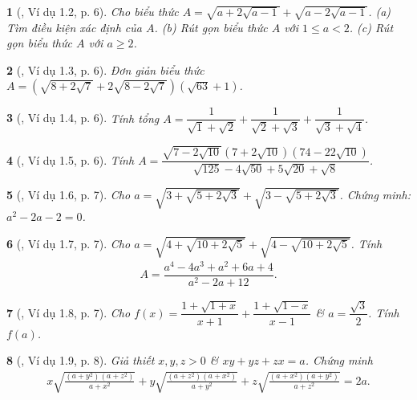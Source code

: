 \documentclass{article}
\newtheorem{baitoan}{}%
\begin{document}
\begin{baitoan}[\cite{TLCT_THCS_Toan_9_dai_so}, Ví dụ 1.2, p. 6]
	Cho biểu thức $A = \sqrt{a + 2\sqrt{a - 1}} + \sqrt{a - 2\sqrt{a - 1}}$. (a) Tìm điều kiện xác định của $A$. (b) Rút gọn biểu thức $A$ với $1\le a < 2$. (c) Rút gọn biểu thức $A$ với $a\ge2$.
\end{baitoan}

\begin{baitoan}[\cite{TLCT_THCS_Toan_9_dai_so}, Ví dụ 1.3, p. 6]
	Đơn giản biểu thức $A = \left(\sqrt{8 + 2\sqrt{7}} + 2\sqrt{8 - 2\sqrt{7}}\right)(\sqrt{63} + 1)$.
\end{baitoan}

\begin{baitoan}[\cite{TLCT_THCS_Toan_9_dai_so}, Ví dụ 1.4, p. 6]
	Tính tổng $A = \dfrac{1}{\sqrt{1} + \sqrt{2}} + \dfrac{1}{\sqrt{2} + \sqrt{3}} + \dfrac{1}{\sqrt{3} + \sqrt{4}}$.
\end{baitoan}

\begin{baitoan}[\cite{TLCT_THCS_Toan_9_dai_so}, Ví dụ 1.5, p. 6]
	Tính $A = \dfrac{\sqrt{7 - 2\sqrt{10}}(7 + 2\sqrt{10})(74 - 22\sqrt{10})}{\sqrt{125} - 4\sqrt{50} + 5\sqrt{20} + \sqrt{8}}$.
\end{baitoan}

\begin{baitoan}[\cite{TLCT_THCS_Toan_9_dai_so}, Ví dụ 1.6, p. 7]
	Cho $a = \sqrt{3 + \sqrt{5 + 2\sqrt{3}}} + \sqrt{3 - \sqrt{5 + 2\sqrt{3}}}$. Chứng minh: $a^2 - 2a - 2 = 0$.
\end{baitoan}

\begin{baitoan}[\cite{TLCT_THCS_Toan_9_dai_so}, Ví dụ 1.7, p. 7]
	Cho $a = \sqrt{4 + \sqrt{10 + 2\sqrt{5}}} + \sqrt{4 - \sqrt{10 + 2\sqrt{5}}}$. Tính
	\begin{align*}
		A = \dfrac{a^4 - 4a^3 + a^2 + 6a + 4}{a^2 - 2a + 12}.
	\end{align*}
\end{baitoan}

\begin{baitoan}[\cite{TLCT_THCS_Toan_9_dai_so}, Ví dụ 1.8, p. 7]
	Cho $f(x) = \dfrac{1 + \sqrt{1 + x}}{x + 1} + \dfrac{1 + \sqrt{1 - x}}{x - 1}$ \& $a = \dfrac{\sqrt{3}}{2}$. Tính $f(a)$.
\end{baitoan}

\begin{baitoan}[\cite{TLCT_THCS_Toan_9_dai_so}, Ví dụ 1.9, p. 8]
	Giả thiết $x,y,z > 0$ \& $xy + yz + zx = a$. Chứng minh
	\begin{align*}
		x\sqrt{\frac{(a + y^2)(a + z^2)}{a + x^2}} + y\sqrt{\frac{(a + z^2)(a + x^2)}{a + y^2}} + z\sqrt{\frac{(a + x^2)(a + y^2)}{a + z^2}} = 2a.
	\end{align*}
\end{baitoan}
\end{document}
